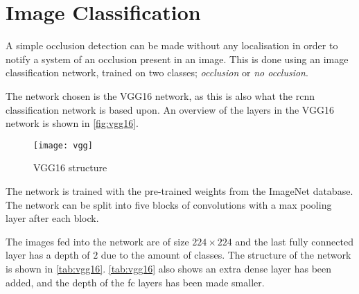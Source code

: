 %
%
%
\section{Image Classification}
A simple occlusion detection can be made without any localisation in order to notify a system of an occlusion present in an image. This is done using an image classification network, trained on two classes; \textit{occlusion} or \textit{no occlusion}.

The network chosen is the VGG16 network, as this is also what the \gls{rcnn} classification network is based upon. An overview of the layers in the VGG16 network is shown in \autoref{fig:vgg16}.

\begin{figure}[H]
	\centering
	\texttt{[image: vgg]}
	\caption{VGG16 structure}
	\label{fig:vgg16}
\end{figure}

The network is trained with the pre-trained weights from the ImageNet database. The network can be split into five blocks of convolutions with a max pooling layer after each block.

The images fed into the network are of size $224 \times 224$ and the last fully connected layer has a depth of $2$ due to the amount of classes. The structure of the network is shown in \autoref{tab:vgg16}. \autoref{tab:vgg16} also shows an extra dense layer has been added, and the depth of the \gls{fc} layers has been made smaller.


